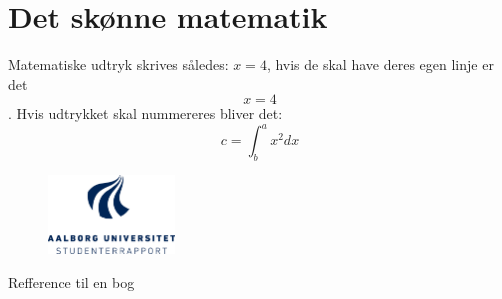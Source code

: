\documentclass[hidelinks, 12pt]{article}
\begin{document}
	\section*{Det skønne matematik} %
	Matematiske udtryk skrives således: $x = 4$, hvis de skal have deres egen linje er det $$ x = 4 $$. Hvis udtrykket skal nummereres bliver det:
	\begin{equation}
		c = \int^{a}_{b} x^2  dx
	\end{equation}

	\begin{figure}[t!]
    	\centering
    	\includegraphics[width=0.3\textwidth]{../Billeder/aaulogo}
    	\label{label til billede}
	\end{figure}

	Refference til en bog \cite{bog}

	
	
\end{document}
